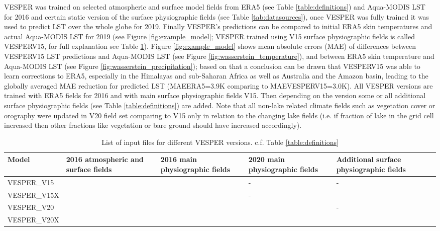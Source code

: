 \documentclass[hess, twostagejnl]{copernicus}
\begin{document}
 \noindent VESPER was trained on selected atmospheric and surface model fields from ERA5 (see Table \ref{table:definitions}) and Aqua-MODIS LST for 2016 and certain static version of the surface physiographic fields (see Table \ref{tab:datasources}), once VESPER was fully trained it was used to predict LST over the whole globe for 2019. Finally VESPER’s predictions can be compared to initial ERA5 skin temperatures and actual Aqua-MODIS LST for 2019 (see Figure \ref{fig:example_model}; VESPER trained using V15 surface physiographic fields is called VESPERV15, for full explanation see Table \ref{tab:vesper_table}). Figure \ref{fig:example_model} shows mean absolute errors (MAE) of differences between VESPERV15 LST predictions and Aqua-MODIS LST (see Figure \ref{fig:wasserstein_temperature}), and between ERA5 skin temperature and Aqua-MODIS LST (see Figure \ref{fig:wasserstein_precipitation}); based on that a conclusion can be drawn that VESPERV15 was able to learn corrections to ERA5, especially in the Himalayas and sub-Saharan Africa as well as Australia and the Amazon basin, leading to the globally averaged MAE reduction for predicted LST (MAEERA5=3.9K comparing to MAEVESPERV15=3.0K). All VESPER versions are trained with ERA5 fields for 2016 and with main surface physiographic fields V15. Then depending on the version some or all additional surface physiographic fields (see Table \ref{table:definitions}) are added. Note that all non-lake related climate fields such as vegetation cover or orography were updated in V20 field set comparing to V15 only in relation to the changing lake fields (i.e. if fraction of lake in the grid cell increased then other fractions like vegetation or bare ground should have increased accordingly). \newline 
 
 \begin{table}
 	\begin{tabularx}{\textwidth}{lXXXX}
 		\toprule
 		Model & 2016 atmospheric and surface fields & 2016 main physiographic fields & 2020 main physiographic fields & Additional surface physiographic fields \\
 		\hline
 		VESPER\_V15 & \checkmark & \checkmark & - & - \\
 		VESPER\_V15X & \checkmark & \checkmark & - & \checkmark \\
 		VESPER\_V20 & \checkmark & \checkmark & \checkmark & - \\
 		VESPER\_V20X & \checkmark & \checkmark & \checkmark & \checkmark \\
 		
 		\bottomrule
 	\end{tabularx}
 	\caption{List of input files for different VESPER versions. c.f. Table \ref{table:definitions}}
 	\label{tab:vesper_table}
 \end{table}
 
\end{document}
